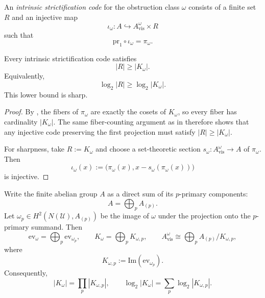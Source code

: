 \begin{definition}\label{def:intrinsic-strictification-code}
An \emph{intrinsic strictification code} for the obstruction class $\omega$ consists of a finite set $R$ and an injective map
\[
\iota_{\omega}:A\hookrightarrow A_{\mathrm{vis}}^{\omega}\times R
\]
such that
\[
\mathrm{pr}_1\circ\iota_{\omega}=\pi_{\omega}.
\]
\end{definition}

\begin{corollary}\label{cor:intrinsic-hidden-state-lower-bound}
Every intrinsic strictification code satisfies
\[
|R|\ge |K_{\omega}|.
\]
Equivalently,
\[
\log_2|R|\ge \log_2|K_{\omega}|.
\]
This lower bound is sharp.
\end{corollary}

\begin{proof}
By , the fibers of $\pi_{\omega}$ are exactly the cosets of $K_{\omega}$, so every fiber has cardinality $|K_{\omega}|$. The same fiber-counting argument as in  therefore shows that any injective code preserving the first projection must satisfy $|R|\ge |K_{\omega}|$.

For sharpness, take $R:=K_{\omega}$ and choose a set-theoretic section $s_{\omega}:A_{\mathrm{vis}}^{\omega}\to A$ of $\pi_{\omega}$. Then
\[
\iota_{\omega}(x):=\bigl(\pi_{\omega}(x),x-s_{\omega}(\pi_{\omega}(x))\bigr)
\]
is injective.
\end{proof}

\begin{proposition}\label{thm:intrinsic-prime-decomposition}
Write the finite abelian group $A$ as a direct sum of its $p$-primary components:
\[
A=\bigoplus_p A_{(p)}.
\]
Let $\omega_p\in H^2(N(\mathcal U),A_{(p)})$ be the image of $\omega$ under the projection onto the $p$-primary summand. Then
\[
\mathrm{ev}_{\omega}=\bigoplus_p \mathrm{ev}_{\omega_p},
\qquad
K_{\omega}=\bigoplus_p K_{\omega,p},
\qquad
A_{\mathrm{vis}}^{\omega}\cong \bigoplus_p A_{(p)}/K_{\omega,p},
\]
where
\[
K_{\omega,p}:=\mathrm{Im}(\mathrm{ev}_{\omega_p}).
\]
Consequently,
\[
|K_{\omega}|=\prod_p |K_{\omega,p}|,
\qquad
\log_2|K_{\omega}|=\sum_p \log_2|K_{\omega,p}|.
\]
\end{proposition}

